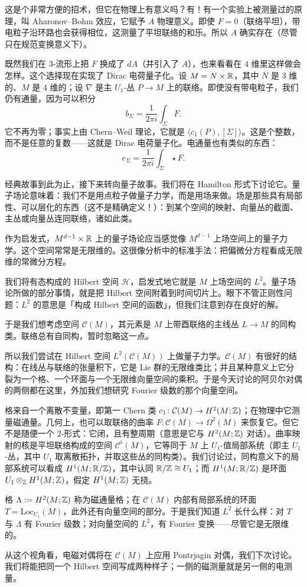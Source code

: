 这是个非常方便的招术，但它在物理上有意义吗？有！有一个实验上被测量过的原理，叫 Aharonov--Bohm 效应，它赋予 $A$ 物理意义。即使 $F = 0$（联络平坦），带电粒子沿环路也会获得相位，这测量了平坦联络的和乐。所以 $A$ 确实存在（尽管只在规范变换意义下）。

既然我们在 $3$-流形上把 $F$ 换成了 $dA$（并引入了 $A$），也来看看在 $4$ 维里这样做会怎样。这个选择现在实现了 Dirac 电荷量子化。设 $M = N\times\mathbb{R}$，其中 $N$ 是 $3$ 维的、$M$ 是 $4$ 维的；设 $\nabla$ 是主 $U_1$-丛 $P\to M$ 上的联络。即使没有带电粒子，我们仍有通量，因为可以积分
\[
  b_\Sigma = \frac{1}{2\pi i}\int_\Sigma F.
\]
它不再为零；事实上由 Chern--Weil 理论，它就是 $\langle c_1(P),[\Sigma]\rangle$。这是个整数，而不是任意的复数——这就是 Dirac 电荷量子化。电通量也有类似的东西：
\[
  e_\Sigma = \frac{1}{2\pi i}\int_\Sigma \star F.
\]

经典故事到此为止，接下来转向量子故事。我们将在 Hamilton 形式下讨论它。量子场论意味着：我们不是用点粒子做量子力学，而是用场来做。场是那些具有局部性、可以层化的东西（这不是精确定义！）：到某个空间的映射、向量丛的截面、主丛或向量丛连同联络，诸如此类。


作为启发式，$M^{d-1}\times\mathbb{R}$ 上的量子场论应当感觉像 $M^{d-1}$ 上场空间上的量子力学。这个空间常常是无限维的。这很像分析中的标准手法：把偏微分方程看成无限维的常微分方程。

我们将有态构成的 Hilbert 空间 $\mathcal{H}$，启发式地它就是 $M$ 上场空间的 $L^2$。量子场论所做的部分事情，就是把 Hilbert 空间附着到时间切片上。眼下不管正则性问题：$L^2$ 的意思是「构成 Hilbert 空间的函数」，但我们注意到存在良好的解。

于是我们想考虑空间 $\mathcal{C}(M)$，其元素是 $M$ 上带酉联络的主线丛 $L\to M$ 的同构类。联络总有自同构，暂时忽略这一点。

所以我们尝试在 Hilbert 空间 $L^2(\mathcal{C}(M))$ 上做量子力学。$\mathcal{C}(M)$ 有很好的结构：在线丛与联络的张量积下，它是 Lie 群的无限维类比；并且某种意义上它分裂为一个格、一个环面与一个无限维向量空间的乘积。于是今天讨论的阿贝尔对偶的两侧都在这里，外加我们想研究 Fourier 级数的那个向量空间。

格来自一个离散不变量，即第一 Chern 类 $c_1\colon\mathcal{C}(M)\to H^2(M;\mathbb{Z})$；在物理中它测量磁通量。几何上，也可以取联络的曲率 $F\colon\mathcal{C}(M)\to\Omega^2(M)$ 来恢复它。但它不是随便一个 $2$-形式：它闭，且有整周期（意思是它与 $H^2(M;\mathbb{Z})$ 对话）。曲率映射的核是平坦联络构成的空间 $\mathcal{C}^\flat(M)$，它等同于 $M$ 上 $U_1$-值局部系统（即主 $U_1$-丛，其中 $U_1$ 取离散拓扑，并取这些丛的同构类）。我们讨论过，同构意义下的局部系统可以看成 $H^1(M;\mathbb{R}/\mathbb{Z})$，其中认同 $\mathbb{R}/\mathbb{Z}\cong U_1$；而 $H^1(M;\mathbb{R}/\mathbb{Z})$ 是环面 $U_1\otimes_{\mathbb{Z}} H^1(M;\mathbb{Z})$，假定 $H^1(M;\mathbb{Z})$ 无挠。

格 $\Lambda := H^2(M;\mathbb{Z})$ 称为磁通量格；在 $\mathcal{C}(M)$ 内部有局部系统的环面 $T = \mathrm{Loc}_{U_1}(M)$，此外还有向量空间的部分。于是我们知道 $L^2$ 长什么样：对 $T$ 与 $\Lambda$ 有 Fourier 级数；对向量空间的 $L^2$，有 Fourier 变换——尽管它是无限维的。

从这个视角看，电磁对偶将在 $\mathcal{C}(M)$ 上应用 Pontrjagin 对偶，我们下次讨论。我们将能把同一个 Hilbert 空间写成两种样子；一侧的磁测量就是另一侧的电测量。

